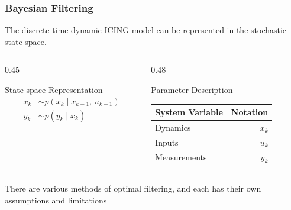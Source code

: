 \documentclass[aspectratio=43]{beamer}
\begin{document}
\begin{frame}
  \frametitle{Bayesian Filtering}
  The discrete-time dynamic ICING model can be represented in the stochastic state-space.
  \vspace{0.2em} 
  \begin{columns}
    \begin{column}{0.45\linewidth} 
      \begin{block}{State-space Representation}
        \begin{align*}
          x_{k} &\sim p(x_{k} \mid x_{k-1},\,u_{k-1}) \\
          y_{k} &\sim p(y_{k} \mid x_{k})
        \end{align*}
      \end{block} 
    \end{column}
    \begin{column}{0.48\linewidth}
    \begin{block}{Parameter Description}
      \begin{table}
        \centering
        \begin{tabularx}{0.96\linewidth}{>{\raggedright\arraybackslash}X r}
          \toprule
          \textbf{System Variable} & \textbf{Notation} \\
          \midrule
          Dynamics & $x_k$ \\
          Inputs & $u_k$ \\
          Measurements & $y_k$ \\
          \bottomrule
        \end{tabularx}
      \end{table} 
    \end{block}
    \end{column}
  \end{columns}
  \vspace{1em}
  There are various methods of optimal filtering, and each has their own assumptions and limitations
\end{frame}
\end{document}
